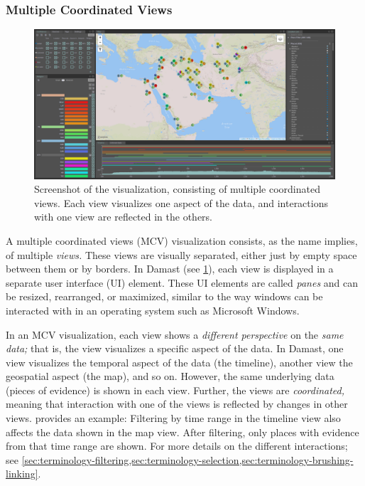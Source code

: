 \subsubsection{Multiple Coordinated Views}
\label{sec:terminology-mcv}

\begin{figure}[tb]
  \centering
  \includegraphics[width=\textwidth]{../src/assets/visualization-documentation/full-vis-screenshot.png}
  \caption{
    Screenshot of the visualization, consisting of multiple coordinated views.
    Each view visualizes one aspect of the data, and interactions with one view are reflected in the others.
  }
  \label{fig:full-vis-screenshot}
\end{figure}

A multiple coordinated views (MCV) visualization consists, as the name implies, of multiple \emph{views.}
These views are visually separated, either just by empty space between them or by borders.
In Damast (see \cref{fig:full-vis-screenshot}), each view is displayed in a separate user interface (UI) element.
These UI elements are called \emph{panes} and can be resized, rearranged, or maximized, similar to the way windows can be interacted with in an operating system such as Microsoft Windows.

In an MCV visualization, each view shows a \emph{different perspective} on the \emph{same data;}
that is, the view visualizes a specific aspect of the data.
In Damast, one view visualizes the temporal aspect of the data (the timeline), another view the geospatial aspect (the map), and so on.
However, the same underlying data (pieces of evidence) is shown in each view.
Further, the views are \emph{coordinated,} meaning that interaction with one of the views is reflected by changes in other views.
 provides an example:
Filtering by time range in the timeline view also affects the data shown in the map view.
After filtering, only places with evidence from that time range are shown.
For more details on the different interactions; see \cref{sec:terminology-filtering,sec:terminology-selection,sec:terminology-brushing-linking}.


